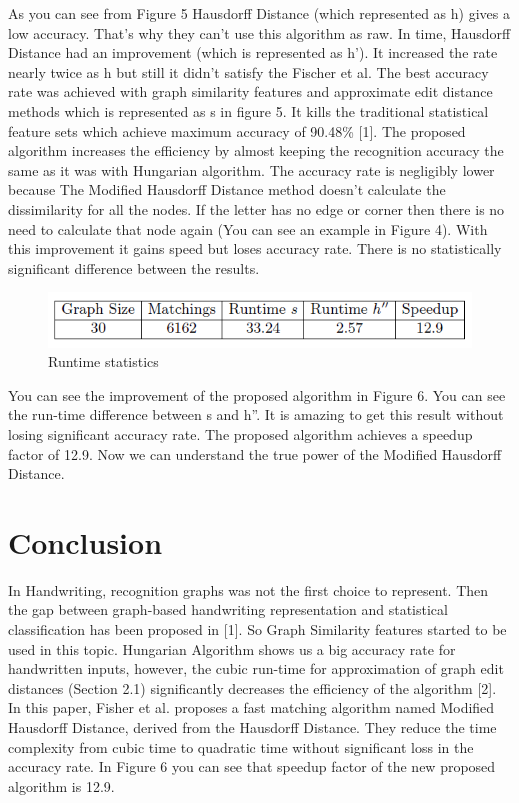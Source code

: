 \documentclass{article}
\begin{document}
As you can see from Figure 5 Hausdorff Distance (which represented as h) gives a low accuracy. That's why they can't use this algorithm as raw. In time, Hausdorff Distance had an improvement (which is represented as h'). It increased the rate nearly  twice as h but still it didn't satisfy the Fischer et al. The best accuracy rate was achieved with graph similarity features and approximate edit distance methods which is represented as s in figure 5. It kills the traditional statistical feature sets which achieve maximum accuracy of 90.48\% [1]. The proposed algorithm increases the efficiency by almost keeping the recognition accuracy the same as it was with Hungarian algorithm. The accuracy rate is negligibly lower because The Modified Hausdorff Distance method doesn't calculate the dissimilarity for all the nodes. If the letter has no edge or corner then there is no need to calculate that node again (You can see an example in Figure 4). With this improvement it gains speed but loses accuracy rate. There is no statistically significant difference between the results. 

\begin{center}
\end{center}
\begin{figure}[h]
    \centering
    \includegraphics[width = .8\textwidth]{Images/result.png}
    \caption{Runtime statistics}
\end{figure} 

You can see the improvement of the proposed algorithm in Figure 6. You can see the run-time difference between s and h''. It is amazing to get this result without losing significant accuracy rate. The proposed algorithm achieves a speedup factor of 12.9. Now we can understand the true power of the Modified Hausdorff Distance.


\section{Conclusion}
In Handwriting, recognition graphs was not the first choice to represent. Then the gap between graph-based handwriting representation and statistical classification has been proposed in [1]. So Graph Similarity features started to be used in this topic. Hungarian Algorithm shows us a big accuracy rate for handwritten inputs, however, the cubic run-time for approximation of graph edit distances (Section 2.1) significantly decreases the efficiency of the algorithm [2]. In this paper, Fisher et al. proposes a fast matching algorithm named Modified Hausdorff Distance, derived from the Hausdorff Distance. They reduce the time complexity from cubic time to quadratic time without significant loss in the accuracy rate. In Figure 6 you can see that speedup factor of the new proposed algorithm is 12.9.
\end{document}
